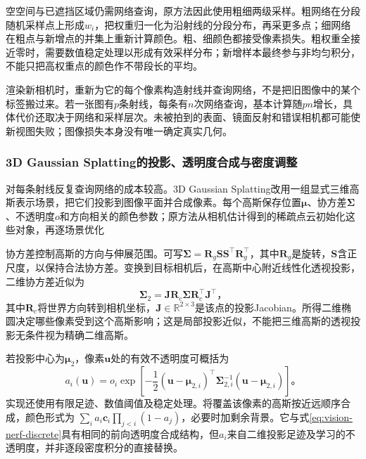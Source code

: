 空空间与已遮挡区域仍需网络查询，原方法因此使用粗细两级采样。粗网络在分段随机采样点上形成$w_i$，把权重归一化为沿射线的分段分布，再采更多点；细网络在粗点与新增点的并集上重新计算颜色。粗、细颜色都接受像素损失。粗权重全接近零时，需要数值稳定处理以形成有效采样分布；新增样本最终参与非均匀积分，不能只把高权重点的颜色作不带段长的平均。

渲染新相机时，重新为它的每个像素构造射线并查询网络，不是把旧图像中的某个标签搬过来。若一张图有$p$条射线，每条有$n$次网络查询，基本计算随$pn$增长，具体代价还取决于网络和采样层次。未被拍到的表面、镜面反射和错误相机都可能使新视图失败；图像损失本身没有唯一确定真实几何。

\subsubsection{3D Gaussian Splatting的投影、透明度合成与密度调整}
\label{sec:vision-generation-gaussians}

对每条射线反复查询网络的成本较高。3D Gaussian Splatting改用一组显式三维高斯表示场景，把它们投影到图像平面并合成像素。每个高斯保存位置$\bm{\mu}$、协方差$\bm{\Sigma}$、不透明度$o$和方向相关的颜色参数；原方法从相机估计得到的稀疏点云初始化这些对象，再逐场景优化

协方差控制高斯的方向与伸展范围。可写$\bm{\Sigma}=\bm{R}_{g}\bm{S}\bm{S}^{\top}\bm{R}_{g}^{\top}$，其中$\bm{R}_{g}$是旋转，$\bm{S}$含正尺度，以保持合法协方差。变换到目标相机后，在高斯中心附近线性化透视投影，二维协方差近似为
\begin{equation}
 \bm{\Sigma}_{2}
 =\bm{J}\bm{R}_{c}\bm{\Sigma}
    \bm{R}_{c}^{\top}\bm{J}^{\top}\text{，}
 \label{eq:vision-gaussian-projection}
\end{equation}
其中$\bm{R}_{c}$将世界方向转到相机坐标，$\bm{J}\in\mathbb{R}^{2\times3}$是该点的投影Jacobian。所得二维椭圆决定哪些像素受到这个高斯影响；这是局部投影近似，不能把三维高斯的透视投影无条件视为精确二维高斯。

若投影中心为$\bm{\mu}_{2}$，像素$\bm{u}$处的有效不透明度可概括为
\begin{equation}
 a_i(\bm{u})=o_i\exp\!\left[
 -\frac12(\bm{u}-\bm{\mu}_{2,i})^\top
 \bm{\Sigma}_{2,i}^{-1}(\bm{u}-\bm{\mu}_{2,i})
 \right]\text{。}
 \label{eq:vision-gaussian-alpha}
\end{equation}
实现还使用有限足迹、数值阈值及稳定处理。将覆盖该像素的高斯按近远顺序合成，颜色形式为
$\sum_i a_i\bm{c}_i\prod_{j<i}(1-a_j)$，必要时加剩余背景。它与式\eqref{eq:vision-nerf-discrete}具有相同的前向透明度合成结构，但$a_i$来自二维投影足迹及学习的不透明度，并非逐段密度积分的直接替换。

